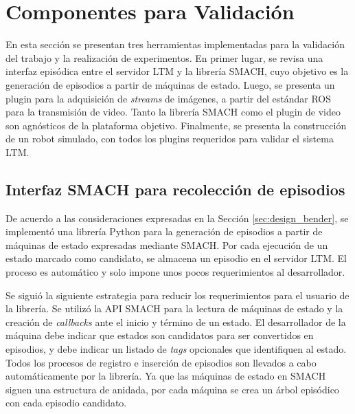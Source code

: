 
\section{Componentes para Validación}\label{sec:impl-validation}

En esta sección se presentan tres herramientas implementadas para la validación del trabajo y la realización de experimentos. En primer lugar, se revisa una interfaz episódica entre el servidor LTM y la librería SMACH, cuyo objetivo es la generación de episodios a partir de máquinas de estado. Luego, se presenta un plugin para la adquisición de \textit{streams} de imágenes, a partir del estándar ROS para la transmisión de video. Tanto la librería SMACH como el plugin de video son agnósticos de la plataforma objetivo. Finalmente, se presenta la construcción de un robot simulado, con todos los plugins requeridos para validar el sistema LTM. 

\subsection{Interfaz SMACH para recolección de episodios}

De acuerdo a las consideraciones expresadas en la Sección \ref{sec:design_bender}, se implementó una librería Python para la generación de episodios a partir de máquinas de estado expresadas mediante SMACH. Por cada ejecución de un estado marcado como candidato, se almacena un episodio en el servidor LTM. El proceso es automático y solo impone unos pocos requerimientos al desarrollador.

 Se siguió la siguiente estrategia para reducir los requerimientos para el usuario de la librería. Se utilizó la API SMACH para la lectura de máquinas de estado y la creación de \textit{callbacks} ante el inicio y término de un estado. El desarrollador de la máquina debe indicar que estados son candidatos para ser convertidos en episodios, y debe indicar un listado de \textit{tags} opcionales que identifiquen al estado. Todos los procesos de registro e inserción de episodios son llevados a cabo automáticamente por la librería. Ya que las máquinas de estado en SMACH siguen una estructura de anidada, por cada máquina se crea un árbol episódico con cada episodio candidato.

